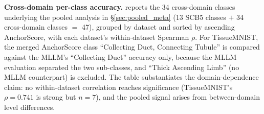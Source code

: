 \documentclass[a4paper,fleqn]{cas-sc}
\begin{document}
\textbf{Cross-domain per-class accuracy.}  reports the 34 cross-domain classes underlying the pooled analysis in \S\ref{sec:pooled_meta} (13 SCB5 classes $+$ 34 cross-domain classes $=$ 47), grouped by dataset and sorted by ascending AnchorScore, with each dataset's within-dataset Spearman $\rho$. For TissueMNIST, the merged AnchorScore class ``Collecting Duct, Connecting Tubule'' is compared against the MLLM's ``Collecting Duct'' accuracy only, because the MLLM evaluation separated the two sub-classes, and ``Thick Ascending Limb'' (no MLLM counterpart) is excluded. The table substantiates the domain-dependence claim: no within-dataset correlation reaches significance (TissueMNIST's $\rho=0.741$ is strong but $n=7$), and the pooled signal arises from between-domain level differences.
\end{document}
